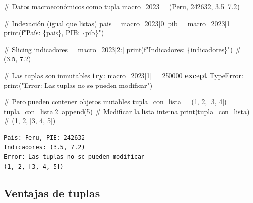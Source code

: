 \documentclass[
  doc,
  floatsintext,
  longtable,
  a4paper,
  nolmodern,
  notxfonts,
  notimes,
  12pt,
  colorlinks=true,linkcolor=blue,citecolor=blue,urlcolor=blue]{apa7}
\newenvironment{Shaded}{\begin{snugshade}}{\end{snugshade}}
\newcommand{\BuiltInTok}[1]{\textcolor[rgb]{0.00,0.23,0.31}{#1}}
\newcommand{\CommentTok}[1]{\textcolor[rgb]{0.37,0.37,0.37}{#1}}
\newcommand{\ControlFlowTok}[1]{\textcolor[rgb]{0.00,0.23,0.31}{\textbf{#1}}}
\newcommand{\DecValTok}[1]{\textcolor[rgb]{0.68,0.00,0.00}{#1}}
\newcommand{\FloatTok}[1]{\textcolor[rgb]{0.68,0.00,0.00}{#1}}
\newcommand{\NormalTok}[1]{\textcolor[rgb]{0.00,0.23,0.31}{#1}}
\newcommand{\OperatorTok}[1]{\textcolor[rgb]{0.37,0.37,0.37}{#1}}
\newcommand{\PreprocessorTok}[1]{\textcolor[rgb]{0.68,0.00,0.00}{#1}}
\newcommand{\SpecialCharTok}[1]{\textcolor[rgb]{0.37,0.37,0.37}{#1}}
\newcommand{\SpecialStringTok}[1]{\textcolor[rgb]{0.13,0.47,0.30}{#1}}
\newcommand{\StringTok}[1]{\textcolor[rgb]{0.13,0.47,0.30}{#1}}
\begin{document}
\begin{Shaded}
\begin{Highlighting}[]
\CommentTok{\# Datos macroeconómicos como tupla}
\NormalTok{macro\_2023 }\OperatorTok{=}\NormalTok{ (}\StringTok{\textquotesingle{}Peru\textquotesingle{}}\NormalTok{, }\DecValTok{242632}\NormalTok{, }\FloatTok{3.5}\NormalTok{, }\FloatTok{7.2}\NormalTok{)}

\CommentTok{\# Indexación (igual que listas)}
\NormalTok{pais }\OperatorTok{=}\NormalTok{ macro\_2023[}\DecValTok{0}\NormalTok{]}
\NormalTok{pib }\OperatorTok{=}\NormalTok{ macro\_2023[}\DecValTok{1}\NormalTok{]}
\BuiltInTok{print}\NormalTok{(}\SpecialStringTok{f"País: }\SpecialCharTok{\{}\NormalTok{pais}\SpecialCharTok{\}}\SpecialStringTok{, PIB: }\SpecialCharTok{\{}\NormalTok{pib}\SpecialCharTok{\}}\SpecialStringTok{"}\NormalTok{)}

\CommentTok{\# Slicing}
\NormalTok{indicadores }\OperatorTok{=}\NormalTok{ macro\_2023[}\DecValTok{2}\NormalTok{:]}
\BuiltInTok{print}\NormalTok{(}\SpecialStringTok{f"Indicadores: }\SpecialCharTok{\{}\NormalTok{indicadores}\SpecialCharTok{\}}\SpecialStringTok{"}\NormalTok{)  }\CommentTok{\# (3.5, 7.2)}

\CommentTok{\# Las tuplas son inmutables}
\ControlFlowTok{try}\NormalTok{:}
\NormalTok{    macro\_2023[}\DecValTok{1}\NormalTok{] }\OperatorTok{=} \DecValTok{250000}
\ControlFlowTok{except} \PreprocessorTok{TypeError}\NormalTok{:}
    \BuiltInTok{print}\NormalTok{(}\StringTok{"Error: Las tuplas no se pueden modificar"}\NormalTok{)}

\CommentTok{\# Pero pueden contener objetos mutables}
\NormalTok{tupla\_con\_lista }\OperatorTok{=}\NormalTok{ (}\DecValTok{1}\NormalTok{, }\DecValTok{2}\NormalTok{, [}\DecValTok{3}\NormalTok{, }\DecValTok{4}\NormalTok{])}
\NormalTok{tupla\_con\_lista[}\DecValTok{2}\NormalTok{].append(}\DecValTok{5}\NormalTok{)  }\CommentTok{\# Modificar la lista interna}
\BuiltInTok{print}\NormalTok{(tupla\_con\_lista)  }\CommentTok{\# (1, 2, [3, 4, 5])}
\end{Highlighting}
\end{Shaded}

\begin{verbatim}
País: Peru, PIB: 242632
Indicadores: (3.5, 7.2)
Error: Las tuplas no se pueden modificar
(1, 2, [3, 4, 5])
\end{verbatim}

\subsection{Ventajas de tuplas}\label{ventajas-de-tuplas}
\end{document}
